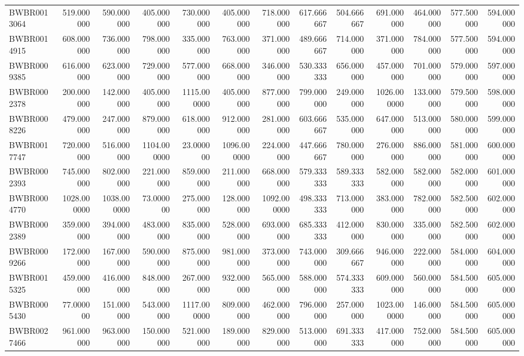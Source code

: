 \begin{longtable}{lrrrrrrrrrrrr}
BWBR0013064 & 519.000000 & 590.000000 & 405.000000 & 730.000000 & 405.000000 & 718.000000 & 617.666667 & 504.666667 & 691.000000 & 464.000000 & 577.500000 & 594.000000 \\
BWBR0014915 & 608.000000 & 736.000000 & 798.000000 & 335.000000 & 763.000000 & 371.000000 & 489.666667 & 714.000000 & 371.000000 & 784.000000 & 577.500000 & 594.000000 \\
BWBR0009385 & 616.000000 & 623.000000 & 729.000000 & 577.000000 & 668.000000 & 346.000000 & 530.333333 & 656.000000 & 457.000000 & 701.000000 & 579.000000 & 597.000000 \\
BWBR0002378 & 200.000000 & 142.000000 & 405.000000 & 1115.000000 & 405.000000 & 877.000000 & 799.000000 & 249.000000 & 1026.000000 & 133.000000 & 579.500000 & 598.000000 \\
BWBR0008226 & 479.000000 & 247.000000 & 879.000000 & 618.000000 & 912.000000 & 281.000000 & 603.666667 & 535.000000 & 647.000000 & 513.000000 & 580.000000 & 599.000000 \\
BWBR0017747 & 720.000000 & 516.000000 & 1104.000000 & 23.000000 & 1096.000000 & 224.000000 & 447.666667 & 780.000000 & 276.000000 & 886.000000 & 581.000000 & 600.000000 \\
BWBR0002393 & 745.000000 & 802.000000 & 221.000000 & 859.000000 & 211.000000 & 668.000000 & 579.333333 & 589.333333 & 582.000000 & 582.000000 & 582.000000 & 601.000000 \\
BWBR0004770 & 1028.000000 & 1038.000000 & 73.000000 & 275.000000 & 128.000000 & 1092.000000 & 498.333333 & 713.000000 & 383.000000 & 782.000000 & 582.500000 & 602.000000 \\
BWBR0002389 & 359.000000 & 394.000000 & 483.000000 & 835.000000 & 528.000000 & 693.000000 & 685.333333 & 412.000000 & 830.000000 & 335.000000 & 582.500000 & 602.000000 \\
BWBR0009266 & 172.000000 & 167.000000 & 590.000000 & 875.000000 & 981.000000 & 373.000000 & 743.000000 & 309.666667 & 946.000000 & 222.000000 & 584.000000 & 604.000000 \\
BWBR0015325 & 459.000000 & 416.000000 & 848.000000 & 267.000000 & 932.000000 & 565.000000 & 588.000000 & 574.333333 & 609.000000 & 560.000000 & 584.500000 & 605.000000 \\
BWBR0005430 & 77.000000 & 151.000000 & 543.000000 & 1117.000000 & 809.000000 & 462.000000 & 796.000000 & 257.000000 & 1023.000000 & 146.000000 & 584.500000 & 605.000000 \\
BWBR0027466 & 961.000000 & 963.000000 & 150.000000 & 521.000000 & 189.000000 & 829.000000 & 513.000000 & 691.333333 & 417.000000 & 752.000000 & 584.500000 & 605.000000 \\

\end{longtable}
